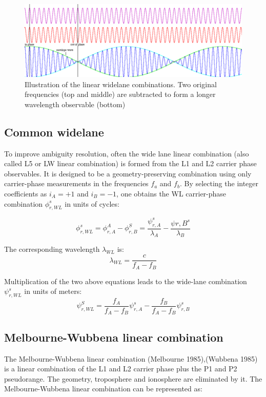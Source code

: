\begin{figure}[h]
\includegraphics[]{images/widelane.png}
  \caption{Illustration of the linear widelane combinations. Two original frequencies (top and middle) are subtracted to form a longer wavelength observable (bottom)}%
  \label{fig:widelane}%
\end{figure}



\subsection{Common widelane}
\begin{fullwidth}
To improve ambiguity resolution, often the wide lane linear combination (also called L5 or LW linear combination) is formed from the L1 and L2 carrier phase observables. It is designed to be a geometry-preserving combination using only carrier-phase measurements in the frequencies $f_a$ and $f_b$. By selecting the integer coefficients as $i_A = +1$ and $i_B = -1$, one obtains the WL carrier-phase combination $\phi_{r,WL}^s$ in units of cycles:
\end{fullwidth}
\begin{equation}
\phi_{r,WL}^s = \phi_{r,A}^A - \phi_{r,B}^S = \frac{\psi_{r,A}^s}{\lambda_A} - \frac{\psi{r,B}^s}{\lambda_B} \label{eq:wl_cycles}
\end{equation}

The corresponding wavelength $\lambda_{WL}$ is:
\begin{equation}
\lambda_{WL} = \frac{c}{f_A - f_B} 
    \label{eq:wl_wavelength}
\end{equation}

Multiplication of the two above equations leads to the wide-lane combination $\psi_{r,WL}^s$ in units of meters:
\begin{equation}
\psi_{r,WL}^S = \frac{f_A}{f_A-f_B}\psi_{r,A}^s - \frac{f_B}{f_A-f_B}\psi_{r,B}^s
\end{equation}

\subsection{Melbourne-Wubbena linear combination}
The Melbourne-Wubbena linear combination (Melbourne 1985),(Wubbena 1985) is a linear combination of the L1 and L2 carrier phase plus the P1 and P2 pseudorange. The geometry, troposphere and ionosphere are eliminated by it. The Melbourne-Wubbena linear combination can be represented as:


